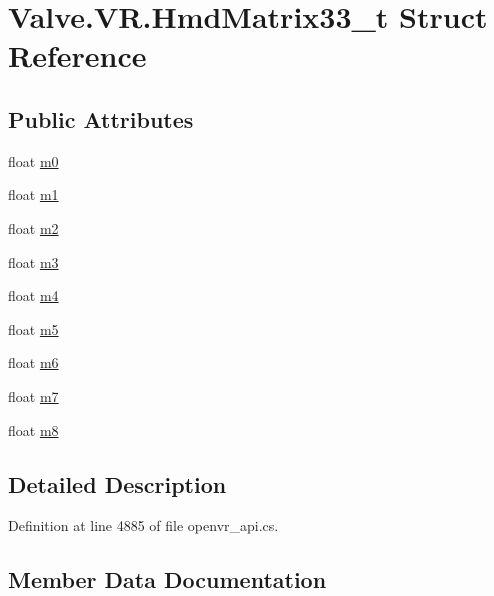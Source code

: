 \hypertarget{struct_valve_1_1_v_r_1_1_hmd_matrix33__t}{}\section{Valve.\+V\+R.\+Hmd\+Matrix33\+\_\+t Struct Reference}
\label{struct_valve_1_1_v_r_1_1_hmd_matrix33__t}
\subsection*{Public Attributes}
\begin{DoxyCompactItemize}
\item 
float \mbox{\hyperlink{struct_valve_1_1_v_r_1_1_hmd_matrix33__t_a695392beaad1e323d164cb9732bb6818}{m0}}
\item 
float \mbox{\hyperlink{struct_valve_1_1_v_r_1_1_hmd_matrix33__t_a9be767bbb10987463bf4e9a3a6667508}{m1}}
\item 
float \mbox{\hyperlink{struct_valve_1_1_v_r_1_1_hmd_matrix33__t_ab8ef61a62f3e0139c1197261e9da847e}{m2}}
\item 
float \mbox{\hyperlink{struct_valve_1_1_v_r_1_1_hmd_matrix33__t_a32afd4b82ed39013eeb8a6097009e843}{m3}}
\item 
float \mbox{\hyperlink{struct_valve_1_1_v_r_1_1_hmd_matrix33__t_a9c1e01d1e0d7b8fd1820d1abf2600e26}{m4}}
\item 
float \mbox{\hyperlink{struct_valve_1_1_v_r_1_1_hmd_matrix33__t_a56408ec69795897adee04b8334b6ac1d}{m5}}
\item 
float \mbox{\hyperlink{struct_valve_1_1_v_r_1_1_hmd_matrix33__t_a5cc51528c2191d8f5ac8a841c876b6c4}{m6}}
\item 
float \mbox{\hyperlink{struct_valve_1_1_v_r_1_1_hmd_matrix33__t_ab2a1701e865f3f0f5c58acea5a2c8a12}{m7}}
\item 
float \mbox{\hyperlink{struct_valve_1_1_v_r_1_1_hmd_matrix33__t_aaae3e4fa1393cc4e445761495e60e6e8}{m8}}
\end{DoxyCompactItemize}


\subsection{Detailed Description}


Definition at line 4885 of file openvr\+\_\+api.\+cs.



\subsection{Member Data Documentation}
\mbox{\label{struct_valve_1_1_v_r_1_1_hmd_matrix33__t_a695392beaad1e323d164cb9732bb6818}} 
